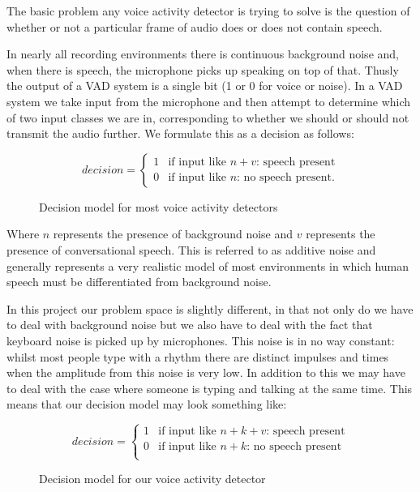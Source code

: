 \documentclass[ %
                    author={Sam Phippen},
                supervisor={Dr. Rafal Bogacz},
                     title={Real time voice activity detectors in noisy personal computing environments},
                  subtitle={},
                    degree={MEng},
                      year={2012} ]{thesis}
\begin{document}
The basic problem any voice activity detector is trying to solve is the
question of whether or not a particular frame of audio does or does not contain
speech.

In nearly all recording environments there is continuous background
noise and, when there is speech, the microphone picks up speaking on top of
that. Thusly the output of a VAD system is a single bit (1 or 0 for voice or
noise). In a VAD system we take input from the microphone and then attempt to
determine which of two input classes we are in, corresponding to whether we
should or should not transmit the audio further. We formulate this as a
decision as follows:

\begin{figure}
\[ decision = \left\{ \begin{array}{ll}
            1 & \mbox{if input like $n + v$: speech present}\\
    0 & \mbox{if input like $n$: no speech present}.\end{array} \right. \]
            \label{eqn:decision 1}
            \caption{Decision model for most voice activity detectors}
        \end{figure}

Where $n$ represents the presence of background noise and $v$ represents the
presence of conversational speech. This is referred to as additive
noise\cite{sohn} and generally represents a very realistic model of most
environments in which human speech must be differentiated from background noise.

In this project our problem space is slightly different, in that not only do we
have to deal with background noise but we also have to deal with the fact that
keyboard noise is picked up by microphones. This noise is in no way constant:
whilst most people type with a rhythm there are distinct impulses and times
when the amplitude from this noise is very low. In addition to this we may have
to deal with the case where someone is typing and talking at the same time. This
means that our decision model may look something like:

\begin{figure}
\[ decision = \left\{ \begin{array}{ll}
            1 & \mbox{if input like $n + k + v$: speech present}\\
            0 & \mbox{if input like $n + k$: no speech present}\\
    \end{array} \right. \]
            \label{eqn:decision 1}
            \caption{Decision model for our voice activity detector}
\end{figure}
\end{document}
